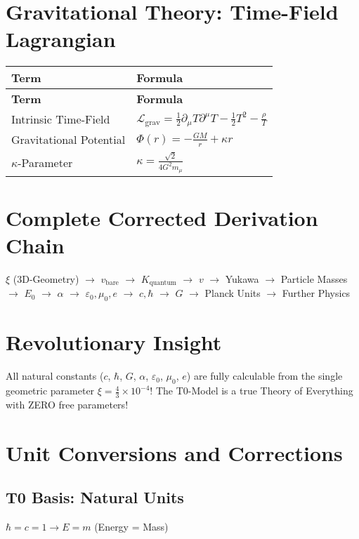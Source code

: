 \documentclass[12pt,a4paper]{article}
\begin{document}
	\section{Gravitational Theory: Time-Field Lagrangian}
	\begin{longtable}{|p{5cm}|p{6cm}|}
		\hline
		\textbf{Term} & \textbf{Formula} \\
		\hline
		\endfirsthead
		\hline
		\textbf{Term} & \textbf{Formula} \\
		\hline
		\endhead
		Intrinsic Time-Field & $\mathcal{L}_{\text{grav}} = \frac{1}{2}\partial_{\mu}T\partial^{\mu}T - \frac{1}{2}T^{2} - \frac{\rho}{T}$ \\
		\hline
		Gravitational Potential & $\Phi(r) = -\frac{GM}{r} + \kappa r$ \\
		\hline
		$\kappa$-Parameter & $\kappa = \frac{\sqrt{2}}{4G^{2}m_{\mu}}$ \\
		\hline
	\end{longtable}
	
	\section{Complete Corrected Derivation Chain}
	\begin{center}
		\parbox{10cm}{\centering $\xi$ (3D-Geometry) $\rightarrow$ $v_{\text{bare}}$ $\rightarrow$ $K_{\text{quantum}}$ $\rightarrow$ $v$ $\rightarrow$ Yukawa $\rightarrow$ Particle Masses $\rightarrow$ $E_0$ $\rightarrow$ $\alpha$ $\rightarrow$ $\varepsilon_0, \mu_0, e$ $\rightarrow$ $c, \hbar$ $\rightarrow$ $G$ $\rightarrow$ Planck Units $\rightarrow$ Further Physics}
	\end{center}
	
	\section{Revolutionary Insight}
	All natural constants ($c$, $\hbar$, $G$, $\alpha$, $\varepsilon_0$, $\mu_0$, $e$) are fully calculable from the single geometric parameter $\xi = \frac{4}{3} \times 10^{-4}$! The T0-Model is a true Theory of Everything with ZERO free parameters!
	
	\section{Unit Conversions and Corrections}
	\subsection{T0 Basis: Natural Units}
	\begin{center}
		$\hbar = c = 1 \rightarrow E = m$ (Energy = Mass)
	\end{center}
	
\end{document}
